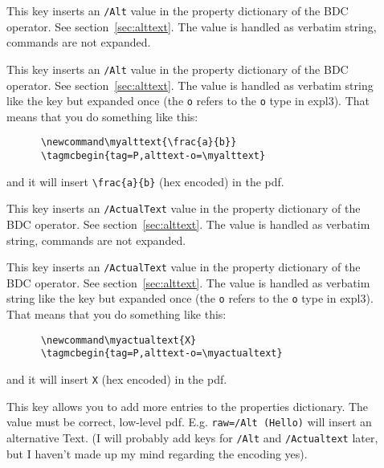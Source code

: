 \documentclass[DIV=12,parskip=half-,bibliography=totoc]{scrartcl}
\begin{document}
\begin{description}
  \item[] This key inserts an \texttt{/Alt} value in the property dictionary of the BDC operator. See section~\ref{sec:alttext}. The value is handled as verbatim string, commands are not expanded.

  \item[] This key inserts an \texttt{/Alt} value in the property dictionary of the BDC operator. See section~\ref{sec:alttext}. The value is handled as verbatim string like the key  but expanded once (the \texttt{o} refers to the \texttt{o} type in expl3). That means that you do something like this:

      \begin{lstlisting}
      \newcommand\myalttext{\frac{a}{b}}
      \tagmcbegin{tag=P,alttext-o=\myalttext}
      \end{lstlisting}

      and it will insert \verb+\frac{a}{b}+  (hex encoded) in the pdf.

  \item[] This key inserts an \texttt{/ActualText} value in the property dictionary of the BDC operator. See section~\ref{sec:alttext}. The value is handled as verbatim string, commands are not expanded.

  \item[] This key inserts an \texttt{/ActualText} value in the property dictionary of the BDC operator. See section~\ref{sec:alttext}. The value is handled as verbatim string like the key  but expanded once (the \texttt{o} refers to the \texttt{o} type in expl3). That means that you do something like this:

      \begin{lstlisting}
      \newcommand\myactualtext{X}
      \tagmcbegin{tag=P,alttext-o=\myactualtext}
      \end{lstlisting}

      and it will insert \verb+X+ (hex encoded)  in the pdf.

  \item[] This key allows you to add more entries to the properties dictionary. The value must be correct, low-level pdf. E.g. \verb+raw=/Alt (Hello)+ will insert an alternative Text. (I will probably add keys for \texttt{/Alt} and \texttt{/Actualtext} later, but I haven't made up my mind regarding the encoding yes).
\end{description}
\end{document}

